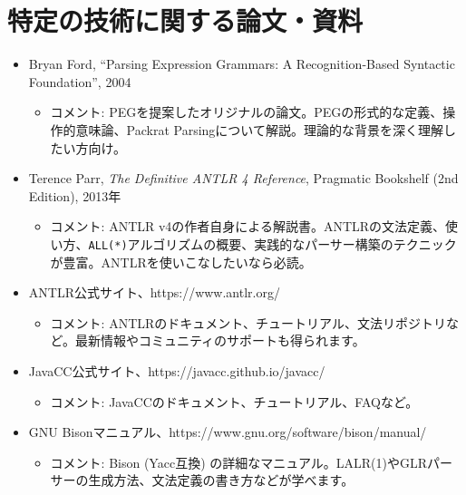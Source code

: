 \hypertarget{chapter8-ux7279ux5b9aux306eux6280ux8853ux306bux95a2ux3059ux308bux8ad6ux6587ux8cc7ux6599}{%
\section{特定の技術に関する論文・資料}\label{chapter8-ux7279ux5b9aux306eux6280ux8853ux306bux95a2ux3059ux308bux8ad6ux6587ux8cc7ux6599}}

\begin{itemize}
\tightlist
\item
  Bryan Ford, ``Parsing Expression Grammars: A Recognition-Based
  Syntactic Foundation'', 2004

  \begin{itemize}
  \tightlist
  \item
    コメント:
    PEGを提案したオリジナルの論文。PEGの形式的な定義、操作的意味論、Packrat
    Parsingについて解説。理論的な背景を深く理解したい方向け。
  \end{itemize}
\item
  Terence Parr, \emph{The Definitive ANTLR 4 Reference}, Pragmatic
  Bookshelf (2nd Edition), 2013年

  \begin{itemize}
  \tightlist
  \item
    コメント: ANTLR
    v4の作者自身による解説書。ANTLRの文法定義、使い方、\texttt{ALL(*)}アルゴリズムの概要、実践的なパーサー構築のテクニックが豊富。ANTLRを使いこなしたいなら必読。
  \end{itemize}
\item
  ANTLR公式サイト、https://www.antlr.org/

  \begin{itemize}
  \tightlist
  \item
    コメント:
    ANTLRのドキュメント、チュートリアル、文法リポジトリなど。最新情報やコミュニティのサポートも得られます。
  \end{itemize}
\item
  JavaCC公式サイト、https://javacc.github.io/javacc/

  \begin{itemize}
  \tightlist
  \item
    コメント: JavaCCのドキュメント、チュートリアル、FAQなど。
  \end{itemize}
\item
  GNU Bisonマニュアル、https://www.gnu.org/software/bison/manual/

  \begin{itemize}
  \tightlist
  \item
    コメント: Bison (Yacc互換)
    の詳細なマニュアル。LALR(1)やGLRパーサーの生成方法、文法定義の書き方などが学べます。
  \end{itemize}
\end{itemize}

